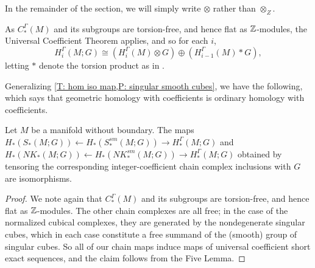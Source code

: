 In the remainder of the section, we will simply write $\otimes$ rather than $\otimes_Z$.

As $C_*^\Gamma(M)$ and its subgroups are torsion-free, and hence flat as $\mathbb{Z}$-modules, the Universal Coefficient Theorem applies, and so for each $i$, $$H_i^\Gamma(M;G) \cong \left(H_i^\Gamma(M) \otimes G \right) \oplus \left(H_{i-1}^\Gamma(M) * G \right),$$
letting $*$ denote the torsion product as in \cite{Munk66}.

Generalizing \cref{T: hom iso map,P: singular smooth cubes}, we have the following, which says that geometric homology with coefficients is ordinary homology with coefficients.

\begin{theorem}\label{T: hom iso map G}
	Let $M$ be a manifold without boundary.
	The maps $H_*(S_*(M;G)) \leftarrow H_*(S^{sm}_*(M;G)) \to H_*^\Gamma(M;G)$ and $H_*(NK_*(M;G)) \leftarrow H_*(NK^{sm}_*(M;G)) \to H_*^\Gamma(M;G)$ obtained by tensoring the corresponding integer-coefficient chain complex inclusions with $G$ are isomorphisms.
\end{theorem}
\begin{proof}
	We note again that $C_*^\Gamma(M)$ and its subgroups are torsion-free, and hence flat as $\mathbb{Z}$-modules.
	The other chain complexes are all free; in the case of the normalized cubical complexes, they are generated by the nondegenerate singular cubes, which in each case constitute a free summand of the (smooth) group of singular cubes.
	So all of our chain maps induce maps of universal coefficient short exact sequences, and the claim follows from the Five Lemma.
\end{proof}
